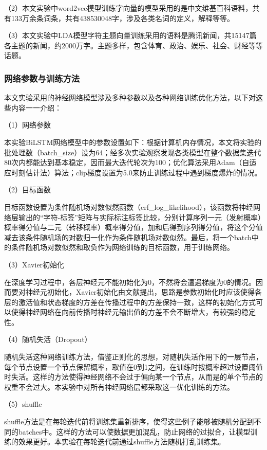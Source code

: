 \documentclass[winfonts,master,oneside,nobackinfo]{njuthesis}
\begin{document}
（2）本文实验中word2vec模型训练字向量的模型采用的是中文维基百科语料，共有133万余条词条，共有438530048字，涉及各类名词的定义，解释等等。

（3）本文实验中LDA模型字符主题向量训练采用的语料是腾讯新闻，共15147篇各主题的新闻，约2000万字。主题多样，包含体育、政治、娱乐、社会、财经等等话题。

\subsubsection{网络参数与训练方法}

本文实验采用的神经网络模型涉及多种参数以及各种网络训练优化方法，以下对这些内容一一介绍：

（1）网络参数

本实验BiLSTM网络模型中的参数设置如下：根据计算机内存情况，本文将实验的批处理数（batch\_size）设为64；经多次实验观察发现各类模型在整个数据集迭代80次内都能达到基本稳定，因而最大迭代轮次为100；优化算法采用Adam\cite{Adam}（自适应时刻估计法）算法；clip梯度设置为5.0来防止训练过程中遇到梯度爆炸的情况。

（2）目标函数

目标函数设置为条件随机场对数似然函数（crf\_log\_likelihood），该函数将神经网络层输出的“字符-标签”矩阵与实际标注标签比较，分别计算序列一元（发射概率）概率得分值与二元（转移概率）概率得分值，加和后得到序列得分值，将这个分值减去该条件随机场的对数归一化作为条件随机场对数似然。最后，将一个batch中的条件随机场对数似然和取负作为网络训练的目标函数，用于训练网络。

（3）Xavier初始化

在深度学习过程中，各层神经元不能初始化为0，不然将会遭遇梯度为0的情况。因而要对神经元初始化，Xavier初始化由文献\cite{Xavier}提出，思路是参数初始化时应该使得各层的激活值和状态梯度的方差在传播过程中的方差保持一致，这样的初始化方式可以使得神经网络在向前传播时神经元输出值的方差不会不断增大，有较强的稳定性。

（4）随机失活（Dropout）

随机失活这种网络训练方法，借鉴正则化的思想，对随机失活作用下的一层节点，每个节点设置一个节点保留概率，取值在0到1之间，在训练时按概率超过设置阈值时失活。这样的方法使得神经网络不会过于偏向某一个节点，从而是的单个节点的权重不会过大。本实验中对所有神经网络层都采取这一优化训练的方法。

（5）shuffle

shuffle方法是在每轮迭代前将训练集重新排序，使得这些例子能够被随机分配到不同的batches中。这样的方法可以使数据更加混乱，防止网络的过拟合，让模型训练的效果更好。本实验在每轮迭代前通过shuffle方法随机打乱训练集。
\end{document}
